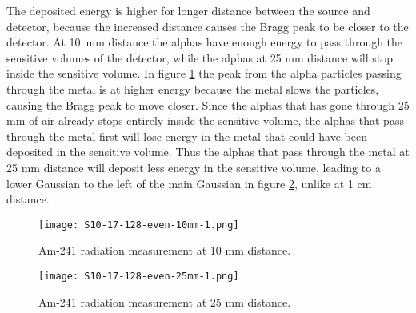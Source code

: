 \documentclass[../main/thesis.tex]{subfiles}
\begin{document}

The deposited energy is higher for longer distance between the source and detector, because the increased distance causes the Bragg peak to be closer to the detector. At 10~mm distance the alphas have enough energy to pass through the sensitive volumes of the detector, while the alphas at 25 mm distance will stop inside the sensitive volume. In figure \ref{fig-3dmimic-am-17-128-10} the peak from the alpha particles passing through the metal is at higher energy because the metal slows the particles, causing the Bragg peak to move closer. Since the alphas that has gone through 25 mm of air already stops entirely inside the sensitive volume, the alphas that pass through the metal first will lose energy in the metal that could have been deposited in the sensitive volume. Thus the alphas that pass through the metal at 25 mm distance will deposit less energy in the sensitive volume, leading to a lower Gaussian to the left of the main Gaussian in figure \ref{fig-3dmimic-am-17-128-25}, unlike at 1 cm distance.


\begin{figure}[p]
	\centering
	\texttt{[image: S10-17-128-even-10mm-1.png]}
	\caption{Am-241 radiation measurement at 10 mm distance.}
	\label{fig-3dmimic-am-17-128-10}
\end{figure}

\begin{figure}[p]
	\centering
	\texttt{[image: S10-17-128-even-25mm-1.png]}
	\caption{Am-241 radiation measurement at 25 mm distance.}
	\label{fig-3dmimic-am-17-128-25}
\end{figure}
\end{document}
